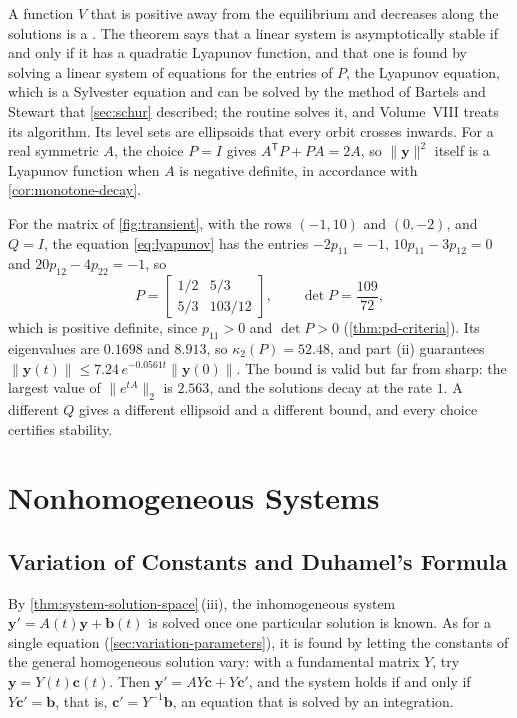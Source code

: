 A function $V$ that is positive away from the equilibrium and decreases along the solutions is a . The theorem says that a linear system is asymptotically stable if and only if it has a quadratic Lyapunov function, and that one is found by solving a linear system of equations for the entries of $P$, the Lyapunov equation, which is a Sylvester equation and can be solved by the method of Bartels and Stewart that \cref{sec:schur} described; the routine  solves it, and Volume~VIII treats its algorithm. Its level sets are ellipsoids that every orbit crosses inwards. For a real symmetric $A$, the choice $P=I$ gives $A^{\mathsf T}P+PA=2A$, so $\|\mathbf y\|^2$ itself is a Lyapunov function when $A$ is negative definite, in accordance with \cref{cor:monotone-decay}.

For the matrix of \cref{fig:transient}, with the rows $(-1,10)$ and $(0,-2)$, and $Q=I$, the equation \eqref{eq:lyapunov} has the entries $-2p_{11}=-1$, $10p_{11}-3p_{12}=0$ and $20p_{12}-4p_{22}=-1$, so
\[
P=\begin{bmatrix}1/2&5/3\\5/3&103/12\end{bmatrix},\qquad\det P=\frac{109}{72},
\]
which is positive definite, since $p_{11}>0$ and $\det P>0$ (\cref{thm:pd-criteria}). Its eigenvalues are $0.1698$ and $8.913$, so $\kappa_2(P)=52.48$, and part (ii) guarantees $\|\mathbf y(t)\|\le7.24\,e^{-0.0561t}\|\mathbf y(0)\|$. The bound is valid but far from sharp: the largest value of $\|e^{tA}\|_2$ is $2.563$, and the solutions decay at the rate $1$. A different $Q$ gives a different ellipsoid and a different bound, and every choice certifies stability.

\section{Nonhomogeneous Systems}
\label{sec:nonhomogeneous-systems}

\subsection{Variation of Constants and Duhamel's Formula}

By \cref{thm:system-solution-space}\,(iii), the inhomogeneous system $\mathbf y'=A(t)\mathbf y+\mathbf b(t)$ is solved once one particular solution is known. As for a single equation (\cref{sec:variation-parameters}), it is found by letting the constants of the general homogeneous solution vary: with a fundamental matrix $Y$, try $\mathbf y=Y(t)\mathbf c(t)$. Then $\mathbf y'=AY\mathbf c+Y\mathbf c'$, and the system holds if and only if $Y\mathbf c'=\mathbf b$, that is, $\mathbf c'=Y^{-1}\mathbf b$, an equation that is solved by an integration.

